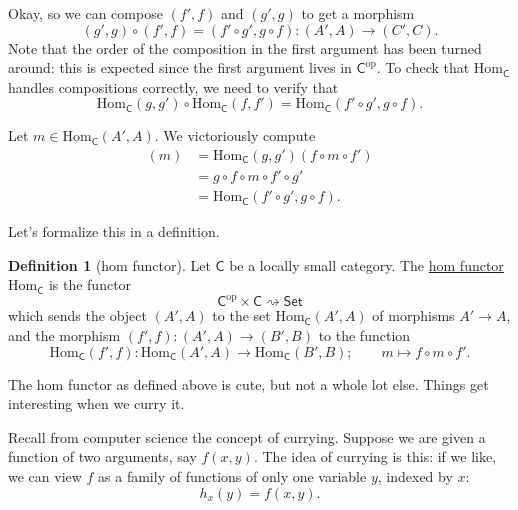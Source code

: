 \documentclass[a4paper,10pt]{scrreprt}
\newcommand{\defn}[1]{\ul{#1}}
\newcommand{\Hom}{\mathrm{Hom}}
\theoremstyle{definition}
\newtheorem{definition}{Definition}[section]
\theoremstyle{plain}
\theoremstyle{remark}
\begin{document}
Okay, so we can compose $(f', f)$ and $(g', g)$ to get a morphism 
\begin{equation*}
  (g', g) \circ (f', f) = (f' \circ g', g \circ f)\colon (A', A) \to (C', C).
\end{equation*}
Note that the order of the composition in the first argument has been turned around: this is expected since the first argument lives in $\mathsf{C}^{\mathrm{op}}$. To check that $\Hom_{\mathsf{C}}$ handles compositions correctly, we need to verify that 
\begin{equation*}
  \Hom_{\mathsf{C}}(g, g') \circ \Hom_{\mathsf{C}}(f, f') = \Hom_{\mathsf{C}}(f' \circ g', g \circ f).
\end{equation*}

Let $m \in \Hom_{\mathsf{C}}(A', A)$. We victoriously compute
\begin{align*}
  [\Hom_{\mathsf{C}}(g, g') \circ \Hom_{\mathsf{C}}(f, f')](m) &= \Hom_{\mathsf{C}}(g, g')(f \circ m \circ f') \\
  &= g \circ f \circ m \circ f' \circ g' \\
  &= \Hom_{\mathsf{C}}(f' \circ g', g \circ f).
\end{align*}

Let's formalize this in a definition.
\begin{definition}[hom functor]
  \label{def:homfunctor}
  Let $\mathsf{C}$ be a locally small category. The \defn{hom functor} $\Hom_{\mathsf{C}}$ is the functor 
  \begin{equation*}
    \mathsf{C}^{\mathrm{op}} \times \mathsf{C} \rightsquigarrow \mathsf{Set}
  \end{equation*}
  which sends the object $(A', A)$ to the set $\Hom_{\mathsf{C}}(A', A)$ of morphisms $A' \to A$, and the morphism $(f', f)\colon (A', A) \to (B', B)$ to the function
  \begin{equation*}
    \Hom_{\mathsf{C}}(f', f)\colon \Hom_{\mathsf{C}}(A', A) \to \Hom_{\mathsf{C}}(B', B);\qquad m \mapsto f \circ m \circ f'.
  \end{equation*}
\end{definition}

The hom functor as defined above is cute, but not a whole lot else. Things get interesting when we curry it.

Recall from computer science the concept of currying. Suppose we are given a function of two arguments, say $f(x, y)$. The idea of currying is this: if we like, we can view $f$ as a family of functions of only one variable $y$, indexed by $x$:
\begin{equation*}
  h_{x}(y) = f(x, y).
\end{equation*}
\end{document}
